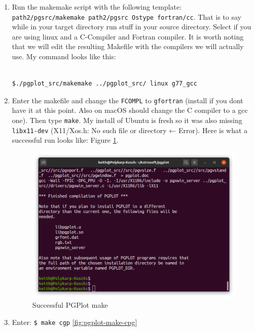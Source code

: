 \documentclass{article}
\begin{document}
\begin{enumerate}
    		\begin{enumerate}
    			\item Run the makemake script with the following template: \texttt{path2/pgsrc/makemake path2/pgsrc Ostype fortran/cc}. That is to say while in your target directory run stuff in your source directory. Select if you are using linux and a C-Compiler and Fortran compiler. It is worth noting that we will edit the resulting Makefile with the compilers we will actually use. My command looks like this: \begin{lstlisting}[language=bash]

$./pgplot_src/makemake ../pgplot_src/ linux g77_gcc
    			\end{lstlisting}
    			\item Enter the makefile and change the \texttt{FCOMPL} to \texttt{gfortran} (install if you dont have it at this point. Also on macOS should change the C compiler to a gcc one). Then type \texttt{make}. My install of Ubuntu is fresh so it was also missing \texttt{libx11-dev} (X11/Xos.h: No such file or directory ← Error). Here is what a successful run looks like: Figure \ref{fig:pgplot-make}.     			
    			\begin{figure}[h]
    				\includegraphics[width=\linewidth]{Images/sucesfful-pgplot-make.png}
    				\caption{Successful PGPlot make}
    				\label{fig:pgplot-make}  			
    			\end{figure}
    			\item Enter: \texttt{\$ make cgp} \ref{fig:pgplot-make-cpg}
    			\begin{figure}[h]

\end{figure}
\end{enumerate}
\end{enumerate}
\end{document}
